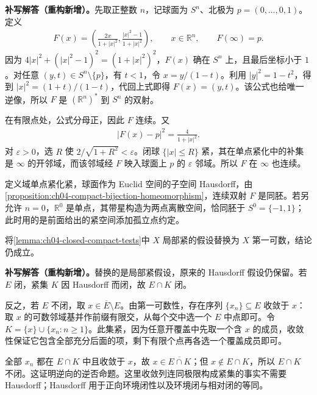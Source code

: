 \documentclass[../../main.tex]{subfiles}%
\begin{document}
\begin{solution}
\textbf{补写解答（重构新增）。}先取正整数 $n$，记球面为 $S^n$、北极为 $p=(0,\ldots,0,1)$。定义
\begin{align*}
F(x)=\left(\frac{2x}{1+|x|^2},\frac{|x|^2-1}{1+|x|^2}\right),
\qquad x\in\mathbb R^n,\qquad F(\infty)=p.
\end{align*}
因为 $4|x|^2+(|x|^2-1)^2=(1+|x|^2)^2$，$F(x)$ 确在 $S^n$ 上，且最后坐标小于 $1$。对任意 $(y,t)\in S^n\setminus\{p\}$，有 $t<1$，令 $x=y/(1-t)$。利用 $|y|^2=1-t^2$，得到 $|x|^2=(1+t)/(1-t)$，代回上式即得 $F(x)=(y,t)$。该公式也给唯一逆像，所以 $F$ 是 $(\mathbb R^n)^*$ 到 $S^n$ 的双射。

在有限点处，公式分母正，因此 $F$ 连续。又
\begin{align*}
|F(x)-p|^2=\frac{4}{1+|x|^2}.
\end{align*}
对 $\varepsilon>0$，选 $R$ 使 $2/\sqrt{1+R^2}<\varepsilon$。闭球 $\{|x|\le R\}$ 紧，其在单点紧化中的补集是 $\infty$ 的开邻域，而该邻域经 $F$ 映入球面上 $p$ 的 $\varepsilon$ 邻域。所以 $F$ 在 $\infty$ 也连续。

定义域单点紧化紧，球面作为 Euclid 空间的子空间 Hausdorff，由\cref{proposition:ch04-compact-bijection-homeomorphism}，连续双射 $F$ 是同胚。若另允许 $n=0$，$\mathbb R^0$ 是单点，其带星构造为两点离散空间，恰同胚于 $S^0=\{-1,1\}$；此时用的是前面给出的紧空间添加孤立点约定。
\end{solution}
\begin{exercise}\label{exercise:ch04-first-countable-compact-tests}
将\cref{lemma:ch04-closed-compact-tests}中 $X$ 局部紧的假设替换为 $X$ 第一可数，结论仍成立。
\end{exercise}
\begin{solution}
\textbf{补写解答（重构新增）。}替换的是局部紧假设，原来的 Hausdorff 假设仍保留。若 $E$ 闭，紧集 $K$ 因 Hausdorff 而闭，故 $E\cap K$ 闭。

反之，若 $E$ 不闭，取 $x\in\overline E\setminus E$。由第一可数性，存在序列 $\{x_n\}\subseteq E$ 收敛于 $x$：取 $x$ 的可数邻域基并作前缀有限交，从每个交中选一个 $E$ 中点即可。令 $K=\{x\}\cup\{x_n:n\ge1\}$。此集紧，因为任意开覆盖中先取一个含 $x$ 的成员，收敛性保证它包含全部充分后面的项，剩下有限个点再各选一个覆盖成员即可。

全部 $x_n$ 都在 $E\cap K$ 中且收敛于 $x$，故 $x\in\overline{E\cap K}$；但 $x\notin E\cap K$，所以 $E\cap K$ 不闭。这证明逆向的逆否命题。这里收敛列连同极限构成紧集的事实不需要 Hausdorff；Hausdorff 用于正向环境闭性以及环境闭与相对闭的等同。
\end{solution}
\end{document}
